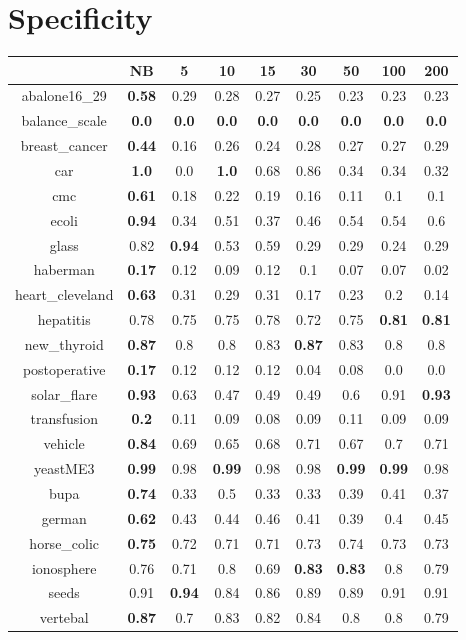\documentclass{article}%
\begin{document}
%
\section*{Specificity}%
\begin{tabular}{c|cccccccc}%
\hline%
&NB&5&10&15&30&50&100&200\\%
\hline%
abalone16\_29&\textbf{0.58}&0.29&0.28&0.27&0.25&0.23&0.23&0.23\\%
\hline%
balance\_scale&\textbf{0.0}&\textbf{0.0}&\textbf{0.0}&\textbf{0.0}&\textbf{0.0}&\textbf{0.0}&\textbf{0.0}&\textbf{0.0}\\%
\hline%
breast\_cancer&\textbf{0.44}&0.16&0.26&0.24&0.28&0.27&0.27&0.29\\%
\hline%
car&\textbf{1.0}&0.0&\textbf{1.0}&0.68&0.86&0.34&0.34&0.32\\%
\hline%
cmc&\textbf{0.61}&0.18&0.22&0.19&0.16&0.11&0.1&0.1\\%
\hline%
ecoli&\textbf{0.94}&0.34&0.51&0.37&0.46&0.54&0.54&0.6\\%
\hline%
glass&0.82&\textbf{0.94}&0.53&0.59&0.29&0.29&0.24&0.29\\%
\hline%
haberman&\textbf{0.17}&0.12&0.09&0.12&0.1&0.07&0.07&0.02\\%
\hline%
heart\_cleveland&\textbf{0.63}&0.31&0.29&0.31&0.17&0.23&0.2&0.14\\%
\hline%
hepatitis&0.78&0.75&0.75&0.78&0.72&0.75&\textbf{0.81}&\textbf{0.81}\\%
\hline%
new\_thyroid&\textbf{0.87}&0.8&0.8&0.83&\textbf{0.87}&0.83&0.8&0.8\\%
\hline%
postoperative&\textbf{0.17}&0.12&0.12&0.12&0.04&0.08&0.0&0.0\\%
\hline%
solar\_flare&\textbf{0.93}&0.63&0.47&0.49&0.49&0.6&0.91&\textbf{0.93}\\%
\hline%
transfusion&\textbf{0.2}&0.11&0.09&0.08&0.09&0.11&0.09&0.09\\%
\hline%
vehicle&\textbf{0.84}&0.69&0.65&0.68&0.71&0.67&0.7&0.71\\%
\hline%
yeastME3&\textbf{0.99}&0.98&\textbf{0.99}&0.98&0.98&\textbf{0.99}&\textbf{0.99}&0.98\\%
\hline%
bupa&\textbf{0.74}&0.33&0.5&0.33&0.33&0.39&0.41&0.37\\%
\hline%
german&\textbf{0.62}&0.43&0.44&0.46&0.41&0.39&0.4&0.45\\%
\hline%
horse\_colic&\textbf{0.75}&0.72&0.71&0.71&0.73&0.74&0.73&0.73\\%
\hline%
ionosphere&0.76&0.71&0.8&0.69&\textbf{0.83}&\textbf{0.83}&0.8&0.79\\%
\hline%
seeds&0.91&\textbf{0.94}&0.84&0.86&0.89&0.89&0.91&0.91\\%
\hline%
vertebal&\textbf{0.87}&0.7&0.83&0.82&0.84&0.8&0.8&0.79\\%
\hline%
\end{tabular}
\end{document}
